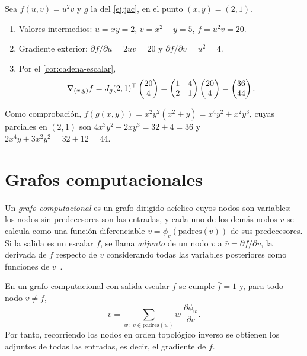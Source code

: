 \begin{ejemplo}\label{ej:cadena}
Sea $f(u,v)=u^{2}v$ y $g$ la del \cref{ej:jac}, en el punto $(x,y)=(2,1)$.
\begin{enumerate}[label=\arabic*.]
  \item Valores intermedios: $u=xy=2$, $v=x^{2}+y=5$, $f=u^{2}v=20$.
  \item Gradiente exterior: $\partial f/\partial u=2uv=20$ y $\partial f/\partial v=u^{2}=4$.
  \item Por el \cref{cor:cadena-escalar},
  \[
  \nabla_{(x,y)}f=J_g(2,1)^{\top}\begin{pmatrix}20\\4\end{pmatrix}=\begin{pmatrix}1&4\\2&1\end{pmatrix}\begin{pmatrix}20\\4\end{pmatrix}=\begin{pmatrix}36\\44\end{pmatrix}.
  \]
\end{enumerate}
Como comprobación, $f(g(x,y))=x^{2}y^{2}(x^{2}+y)=x^{4}y^{2}+x^{2}y^{3}$, cuyas parciales en $(2,1)$ son $4x^{3}y^{2}+2xy^{3}=32+4=36$ y $2x^{4}y+3x^{2}y^{2}=32+12=44$.
\end{ejemplo}

\section{Grafos computacionales}

\begin{definicion}\label{def:grafo}
Un \emph{grafo computacional} es un grafo dirigido acíclico cuyos nodos son variables: los nodos sin predecesores son las entradas, y cada uno de los demás nodos $v$ se calcula como una función diferenciable $v=\phi_v(\text{padres}(v))$ de sus predecesores. Si la salida es un escalar $f$, se llama \emph{adjunto} de un nodo $v$ a $\bar v=\partial f/\partial v$, la derivada de $f$ respecto de $v$ considerando todas las variables posteriores como funciones de $v$~\cite[§6.5.1]{gbc}.
\end{definicion}

\begin{proposicion}[Retropropagación]\label{prop:retro}
En un grafo computacional con salida escalar $f$ se cumple $\bar f=1$ y, para todo nodo $v\neq f$,
\[
\bar v=\sum_{w\,:\,v\in\text{padres}(w)}\bar w\;\frac{\partial\phi_w}{\partial v}.
\]
Por tanto, recorriendo los nodos en orden topológico inverso se obtienen los adjuntos de todas las entradas, es decir, el gradiente de $f$.
\end{proposicion}

